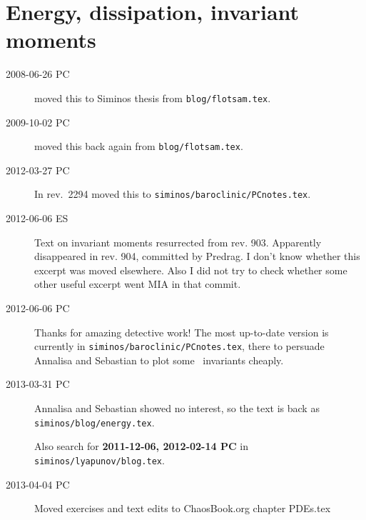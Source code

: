 
\chapter{Energy, dissipation, invariant moments}
\label{c-energy}

\renewcommand{\ssp}{x}             %

\begin{description}
\item[2008-06-26 PC] moved this to Siminos thesis from
        \texttt{blog/flotsam.tex}.
\item[2009-10-02 PC] moved this back again from
        \texttt{blog/flotsam.tex}.
\item[2012-03-27 PC] In rev.~2294 moved this to
        \texttt{siminos/baroclinic/PCnotes.tex}.
\item[2012-06-06 ES]
Text on invariant moments resurrected from rev. 903. Apparently
disappeared in rev. 904, committed by Predrag. I don't know whether this
excerpt was moved elsewhere. Also I did not try to check whether some
other useful excerpt went MIA in that commit.

\item[2012-06-06 PC] Thanks for amazing detective work! The most
up-to-date version is currently in
\texttt{siminos/baroclinic/PCnotes.tex}, there to persuade Annalisa
and Sebastian to plot some \statesp\ invariants cheaply.

\item[2013-03-31 PC] Annalisa and Sebastian showed no interest, so
the text is back as \texttt{siminos/blog/energy.tex}.

Also search for {\bf 2011-12-06, 2012-02-14 PC} in
\texttt{siminos/lyapunov/blog.tex}.

\item[2013-04-04 PC] Moved exercises and text edits to
ChaosBook.org chapter PDEs.tex

\end{description}

\section{\KSe}
\label{s-KS}

